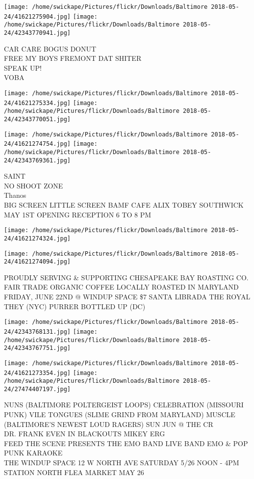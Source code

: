 \documentclass[10pt,letterpaper]{article}
\begin{document}
\texttt{[image: /home/swickape/Pictures/flickr/Downloads/Baltimore 2018-05-24/41621275904.jpg]}
\texttt{[image: /home/swickape/Pictures/flickr/Downloads/Baltimore 2018-05-24/42343770941.jpg]}

CAR CARE BOGUS DONUT\\
FREE MY BOYS FREMONT DAT SHITER\\
SPEAK UP!\\
VOBA
\pagebreak

\texttt{[image: /home/swickape/Pictures/flickr/Downloads/Baltimore 2018-05-24/41621275334.jpg]}
\texttt{[image: /home/swickape/Pictures/flickr/Downloads/Baltimore 2018-05-24/42343770051.jpg]}

\texttt{[image: /home/swickape/Pictures/flickr/Downloads/Baltimore 2018-05-24/41621274754.jpg]}
\texttt{[image: /home/swickape/Pictures/flickr/Downloads/Baltimore 2018-05-24/42343769361.jpg]}

SAINT\\
NO SHOOT ZONE\\
Thanos\\
BIG SCREEN LITTLE SCREEN BAMF CAFE ALIX TOBEY SOUTHWICK MAY 1ST OPENING RECEPTION 6 TO 8 PM
\pagebreak

\texttt{[image: /home/swickape/Pictures/flickr/Downloads/Baltimore 2018-05-24/41621274324.jpg]}

\vspace{0.25in}
\texttt{[image: /home/swickape/Pictures/flickr/Downloads/Baltimore 2018-05-24/41621274094.jpg]}

PROUDLY SERVING \& SUPPORTING CHESAPEAKE BAY ROASTING CO. FAIR TRADE ORGANIC COFFEE LOCALLY ROASTED IN MARYLAND\\
FRIDAY, JUNE 22ND @ WINDUP SPACE \$7 SANTA LIBRADA THE ROYAL THEY (NYC) PURRER BOTTLED UP (DC)
\pagebreak

\texttt{[image: /home/swickape/Pictures/flickr/Downloads/Baltimore 2018-05-24/42343768131.jpg]}
\texttt{[image: /home/swickape/Pictures/flickr/Downloads/Baltimore 2018-05-24/42343767751.jpg]}

\texttt{[image: /home/swickape/Pictures/flickr/Downloads/Baltimore 2018-05-24/41621273354.jpg]}
\texttt{[image: /home/swickape/Pictures/flickr/Downloads/Baltimore 2018-05-24/27474407197.jpg]}

NUNS (BALTIMORE POLTERGEIST LOOPS) CELEBRATION (MISSOURI PUNK) VILE TONGUES (SLIME GRIND FROM MARYLAND) MUSCLE (BALTIMORE'S NEWEST LOUD RAGERS) SUN JUN @ THE CR\\
DR. FRANK EVEN IN BLACKOUTS MIKEY ERG\\
FEED THE SCENE PRESENTS THE EMO BAND LIVE BAND EMO \& POP PUNK KARAOKE\\
THE WINDUP SPACE 12 W NORTH AVE SATURDAY 5/26 NOON {-} 4PM STATION NORTH FLEA MARKET MAY 26
\pagebreak
\end{document}
